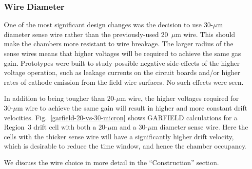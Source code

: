 \subsubsection{Wire Diameter}
One of the most significant design changes was the decision 
to use 30-$\mu$m diameter sense wire rather than the previously-used 
20~$\mu$m wire. 
This should make the chambers more resistant to wire 
breakage.  The larger radius of the sense wires means that higher 
voltages will be required to achieve the same gas gain.
Prototypes were built to study possible negative side-effects of the 
higher voltage operation, such as leakage currents on the circuit boards 
and/or higher rates of cathode emission from the field wire surfaces.
No such effects were seen.

In addition to being tougher than 20-$\mu$m wire, the higher voltages
required for 30-$\mu$m wire to achieve the same gain will result in
higher and more constant drift velocities.
Fig.~\ref{garfield-20-vs-30-micron} shows GARFIELD calculations for a Region~3 drift cell
with both a 20-$\mu$m and a 30-$\mu$m diameter sense wire.  Here the
cells with the thicker sense wire will have a significantly higher drift 
velocity, which is desirable to reduce the time window, and hence the 
chamber occupancy.

We discuss the wire choice in more detail in the ``Construction'' section.




 
